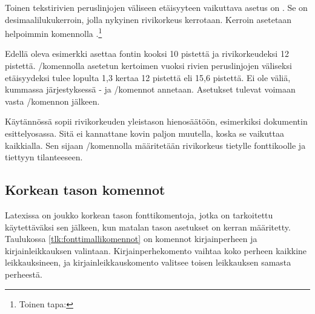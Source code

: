 Toinen tekstirivien peruslinjojen väliseen etäisyyteen vaikuttava asetus
on . Se on desimaalilukukerroin, jolla
nykyinen rivikorkeus kerrotaan. Kerroin asetetaan helpoimmin komennolla
.\footnote{Toinen tapa: }

\begin{koodilohkosis}
  \fontsize{10bp}{12bp} \linespread{1.3} \selectfont
\end{koodilohkosis}

Edellä oleva esimerkki asettaa fontin kooksi 10 pistettä ja
rivikorkeudeksi 12 pistettä. \-/komennolla
asetetun kertoimen vuoksi rivien peruslinjojen väliseksi etäisyydeksi
tulee lopulta 1,3 kertaa 12 pistettä eli 15,6 pistettä. Ei ole väliä,
kummassa järjestyksessä - ja \-/komennot annetaan. Asetukset tulevat voimaan vasta
\-/komennon jälkeen.

Käytännössä  sopii rivikorkeuden yleistason
hienosäätöön, esimerkiksi dokumentin esittelyosassa. Sitä ei kannattane
kovin paljon muutella, koska se vaikuttaa kaikkialla. Sen sijaan
\-/komennolla määritetään rivikorkeus tietylle
fonttikoolle ja tiettyyn tilanteeseen.

\subsection{Korkean tason komennot}
\label{luku:fontit_korkea}

Latexissa on joukko korkean tason fonttikomentoja, jotka on tarkoitettu
käytettäväksi sen jälkeen, kun matalan tason asetukset on kerran
määritetty. Taulukossa \ref{tlk:fonttimallikomennot} on komennot
kirjainperheen ja kirjainleikkauksen valintaan. Kirjainperhekomento
vaihtaa koko perheen kaikkine leikkauksineen, ja kirjainleikkauskomento
valitsee toisen leikkauksen samasta perheestä.


